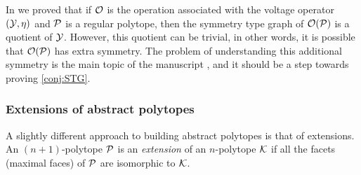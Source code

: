\documentclass[a4paper,12pt,english]{article}
\begin{document}

In \cite[Thm 5.1]{HubaMocMon2023_VoltageOperationsManiplexes} we proved that if $\mathcal{O}$ is the operation associated with the voltage operator $(\mathcal{Y},\eta)$ and $\mathcal{P}$ is a regular polytope, then the symmetry type graph of $\mathcal{O}(\mathcal{P})$ is a quotient of $\mathcal{Y}$.
However, this quotient can be trivial, in other words, it is possible that $\mathcal{O}(\mathcal{P})$ has extra symmetry.
The problem of understanding this additional symmetry is the main topic of the manuscript \cite{HubaMocMon_SymmetriesVoltageOperations_preprint}, and it should be a step towards proving \cref{conj:STG}.

\subsubsection*{Extensions of abstract polytopes} 
A slightly different approach to building abstract polytopes is that of extensions. 
An $(n+1)$-polytope $\mathcal{P}$ is an \emph{extension} of an $n$-polytope $\mathcal{K}$ if all the facets (maximal faces) of $\mathcal{P}$ are isomorphic to $\mathcal{K}$.
\end{document}
